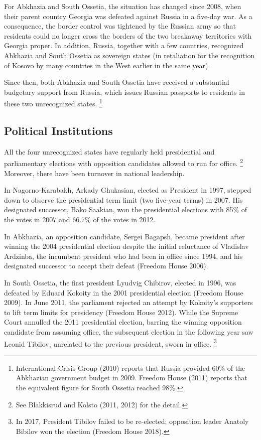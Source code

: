 \documentclass[12pt,a4paper]{article}%
\begin{document}
For Abkhazia and South Ossetia, the situation has changed since 2008, when their parent country Georgia was defeated against Russia in a five-day war. 
As a consequence, the border control was tightened by the Russian army so that residents could no longer cross the borders of the two breakaway territories with Georgia proper.
In addition, Russia, together with a few countries, recognized Abkhazia and South Ossetia as sovereign states (in retaliation for the recognition of Kosovo by many countries in the West earlier in the same year).

Since then, both Abkhazia and South Ossetia have received a substantial budgetary support from Russia, which issues Russian passports to residents in these two unrecognized states.%
\footnote{
	International Crisis Group (2010) reports that Russia provided 60\% of the Abkhazian government budget in 2009.
	Freedom House (2011) reports that the equivalent figure for South Ossetia reached 98\%.
} 

\subsection{Political Institutions}
All the four unrecognized states have regularly held presidential and parliamentary elections with opposition candidates allowed to run for office.%
\footnote{
	See Blakkisrud and Kolsto (2011, 2012) for the detail.
}
Moreover, there have been turnover in national leadership.

In Nagorno-Karabakh, Arkady Ghukasian, elected as President in 1997, stepped down to observe the presidential term limit (two five-year terms) in 2007. His designated successor, Bako Saakian, won the presidential elections with 85\% of the votes in 2007 and 66.7\% of the votes in 2012.

In Abkhazia, an opposition candidate, Sergei Bagapsh, became president after winning the 2004 presidential election despite the initial reluctance of Vladislav Ardzinba, the incumbent president who had been in office since 1994, and his designated successor to accept their defeat (Freedom House 2006).

In South Ossetia, the first president Lyudvig Chibirov, elected in 1996, was defeated by Eduard Kokoity in the 2001 presidential election (Freedom House 2009).
In June 2011, the parliament rejected an attempt by Kokoity's supporters to lift term limits for presidency (Freedom House 2012).
While the Supreme Court annulled the 2011 presidential election, barring the winning opposition candidate from assuming office, the subsequent election in the following year saw Leonid Tibilov, unrelated to the previous president, sworn in office.%
\footnote{
	In 2017, President Tibilov failed to be re-elected; opposition leader Anatoly Bibilov won the election (Freedom House 2018).
} 
\end{document}
